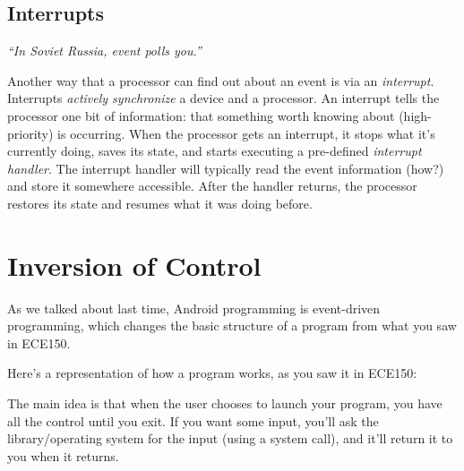 
\subsection*{Interrupts}
\vspace*{-1em}
\hfill \emph{``In Soviet Russia, event polls you.''}

Another way that a processor can find out about an event is via an
\emph{interrupt}. Interrupts \emph{actively synchronize} a device and
a processor.  An interrupt tells the processor one bit of information:
that something worth knowing about (high-priority) is occurring. When
the processor gets an interrupt, it stops what it's currently doing,
saves its state, and starts executing a pre-defined \emph{interrupt
  handler}.  The interrupt handler will typically read the event
information (how?) and store it somewhere accessible.  After the handler
returns, the processor restores its state and resumes what it was
doing before.


\section*{Inversion of Control}
As we talked about last time, Android programming is event-driven programming,
which changes the basic structure of a program from what you saw in ECE150.

Here's a representation of how a program works, as you saw it in ECE150:

\begin{center}
\end{center}

The main idea is that when the user chooses to launch your program,
you have all the control until you exit. If you want some input, you'll ask
the library/operating system for the input (using a system call), and
it'll return it to you when it returns. 

